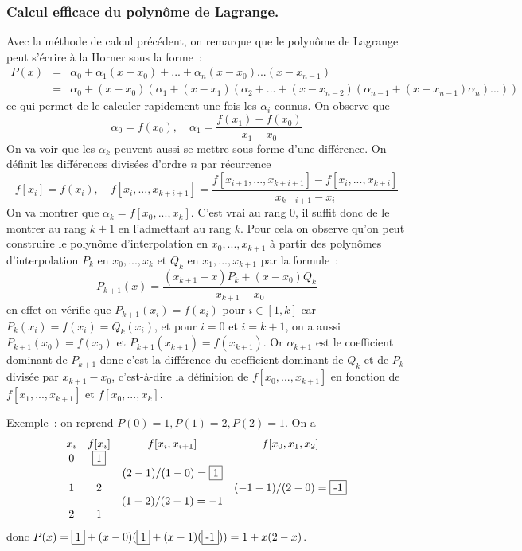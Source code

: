 \documentclass[a4paper,11pt]{article}
\begin{document}
\subsubsection{Calcul efficace du polyn\^ome de
  Lagrange.}
Avec la m\'ethode de calcul pr\'ec\'edent, on remarque que le
polyn\^ome de Lagrange peut s'\'ecrire \`a la Horner sous la forme~:
\begin{eqnarray*}
 P(x) &=& \alpha_0 + \alpha_1 (x-x_0) + ... + \alpha_n
 (x-x_0)...(x-x_{n-1}) \\
&=& \alpha_0 + (x-x_0)( \alpha_1 + (x-x_1)(\alpha_2 +  ... +
(x-x_{n-2})(\alpha_{n-1}+(x-x_{n-1}) \alpha_n)...))
\end{eqnarray*}
ce qui permet de le calculer rapidement une fois les $\alpha_i$
connus.
On observe que 
\[ \alpha_0=f(x_0), \quad \alpha_1=\frac{f(x_1)-f(x_0)}{x_1-x_0} \]
On va voir que les $\alpha_k$ peuvent aussi se mettre sous forme
d'une diff\'erence.
On d\'efinit les diff\'erences divis\'ees d'ordre $n$ par r\'ecurrence
\[ f[x_i]=f(x_i), \quad f[x_i,...,x_{k+i+1}]=
\frac{f[x_{i+1},...,x_{k+i+1}]-f[x_i,...,x_{k+i}]}{x_{k+i+1}-x_i} \]
On va montrer que $\alpha_k=f[x_0,...,x_k]$.
C'est vrai au rang 0, il suffit donc de le montrer au rang $k+1$ en
l'admettant au rang $k$. Pour cela on observe qu'on peut construire 
le polyn\^ome d'interpolation en $x_0,...,x_{k+1}$ \`a partir des polyn\^omes 
d'interpolation $P_k$ en $x_0,...,x_k$ et $Q_k$ en $x_1,...,x_{k+1}$ 
par la formule~:
\[ P_{k+1}(x)= \frac{(x_{k+1}-x)P_k + (x-x_0)Q_k}{x_{k+1}-x_0}\]
en effet on v\'erifie que $P_{k+1}(x_i)=f(x_i)$ pour $i\in [1,k]$ car
$P_k(x_i)=f(x_i)=Q_k(x_i)$,
et pour $i=0$ et $i=k+1$, on a aussi $P_{k+1}(x_0)=f(x_0)$ et  
$P_{k+1}(x_{k+1})=f(x_{k+1})$.
Or $\alpha_{k+1}$ est le coefficient dominant de $P_{k+1}$ donc
c'est la diff\'erence du coefficient dominant de $Q_k$ et de $P_k$
divis\'ee par $x_{k+1}-x_0$, c'est-\`a-dire la d\'efinition de 
$f[x_0,...,x_{k+1}]$ en fonction de $f[x_1,...,x_{k+1}]$ et $f[x_0,...,x_{k}]$.

Exemple~: on reprend $P(0)=1, P(1)=2, P(2)=1$. On a
\[
\begin{array}{cccc}
x_i & f[x_i] & f[x_i,x_{i+1}] & f[x_0,x_1,x_2] \\
0 & \framebox{1} & & \\
  &   & (2-1)/(1-0)=\framebox{1} & \\
1 & 2 & &  (-1-1)/(2-0)=\framebox{-1}   \\
  &   & (1-2)/(2-1)=-1 & \\
2 & 1 & & \\
\end{array}
\]
donc $P(x)=\framebox{1}+(x-0)(\framebox{1}+(x-1)(\framebox{-1}))=1+x(2-x)$.
\end{document}
